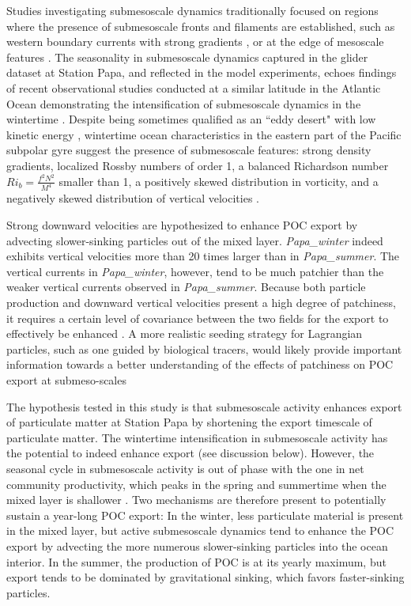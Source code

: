 \documentclass[draft,linenumbers]{agujournal2018}
\begin{document}
Studies investigating submesoscale dynamics traditionally focused on regions where the presence of submesoscale fronts and filaments are established, such as western boundary currents with strong gradients \citep{Dasaro_2011, Thomas_2013}, or at the edge of mesoscale features \citep{vanHaren_2006,Waite_2016}. The seasonality in submesoscale dynamics captured in the glider dataset at Station Papa, and reflected in the model experiments, echoes findings of recent observational studies conducted at a similar latitude in the Atlantic Ocean demonstrating the intensification of submesoscale dynamics in the wintertime \citep{Thompson_2016, Buckingham_2016}. Despite being sometimes qualified as an ``eddy desert" with low kinetic energy \citep{Chelton_2011}, wintertime ocean characteristics in the eastern part of the Pacific subpolar gyre suggest the presence of submesoscale features: strong density gradients, localized Rossby numbers of order 1, a balanced Richardson number $Ri_b = \frac{f^2N^2}{M^4}$ smaller than 1, a positively skewed distribution in vorticity, and a negatively skewed distribution of vertical velocities \citep[see Figure \ref{fig: dynamics};][]{Thomas_2008,Rudnick_2001, Buckingham_2016}.

Strong downward velocities are hypothesized to enhance POC export by advecting slower-sinking particles out of the mixed layer. \textit{Papa\_winter} indeed exhibits vertical velocities more than 20 times larger than in \textit{Papa\_summer}. The vertical currents in \textit{Papa\_winter}, however, tend to be much patchier than the weaker vertical currents observed in \textit{Papa\_summer}. Because both particle production and downward vertical velocities present a high degree of patchiness, it requires a certain level of covariance between the two fields for the export to effectively be enhanced \citep{Mahadevan_2012}. A more realistic seeding strategy for Lagrangian particles, such as one guided by biological tracers, would likely provide important information towards a better understanding of the effects of patchiness on POC export at submeso-scales

The hypothesis tested in this study is that submesoscale activity enhances export of particulate matter at Station Papa by shortening the export timescale of particulate matter. The wintertime intensification in submesoscale activity has the potential to indeed enhance export (see discussion below). However, the seasonal cycle in submesoscale activity is out of phase with the one in net community productivity, which peaks in the spring and summertime when the mixed layer is shallower \citep{Plant_2016}. Two mechanisms are therefore present to potentially sustain a year-long POC export: In the winter, less particulate material is present in the mixed layer, but active submesoscale dynamics tend to enhance the POC export by advecting the more numerous slower-sinking particles into the ocean interior. In the summer, the production of POC is at its yearly maximum, but export tends to be dominated by gravitational sinking, which favors faster-sinking particles.
\end{document}

